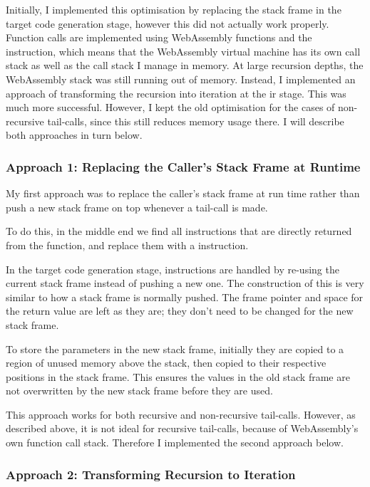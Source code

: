 \documentclass[00-main.tex]{subfiles}
\begin{document}
Initially, I implemented this optimisation by replacing the stack frame in the target code generation stage, however this did not actually work properly.
Function calls are implemented using WebAssembly functions and the  instruction, which means that the WebAssembly virtual machine has its own call stack as well as the call stack I manage in memory.
At large recursion depths, the WebAssembly stack was still running out of memory.
Instead, I implemented an approach of transforming the recursion into iteration at the \gls{ir} stage.
This was much more successful.
However, I kept the old optimisation for the cases of non-recursive tail-calls, since this still reduces memory usage there.
I will describe both approaches in turn below.

\subsubsection{Approach 1: Replacing the Caller's Stack Frame at Runtime}

My first approach was to replace the caller's stack frame at run time rather than push a new stack frame on top whenever a tail-call is made.

To do this, in the middle end we find all  instructions that are directly returned from the function, and replace them with a  instruction.

In the target code generation stage,  instructions are handled by re-using the current stack frame instead of pushing a new one.
The construction of this is very similar to how a stack frame is normally pushed.
The frame pointer and space for the return value are left as they are; they don't need to be changed for the new stack frame.

To store the parameters in the new stack frame, initially they are copied to a region of unused memory above the stack, then copied to their respective positions in the stack frame. This ensures the values in the old stack frame are not overwritten by the new stack frame before they are used.

This approach works for both recursive and non-recursive tail-calls.
However, as described above, it is not ideal for recursive tail-calls, because of WebAssembly's own function call stack.
Therefore I implemented the second approach below.

\subsubsection{Approach 2: Transforming Recursion to Iteration}
\end{document}
